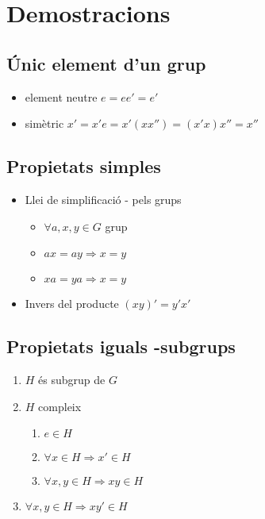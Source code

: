 \documentclass{article}
\begin{document}
\newpage\section{Demostracions}
\subsection{Únic element d'un grup}
\begin{itemize}
\item element neutre $e = ee' = e'$
\item simètric $x' = x'e = x'(xx'') = (x'x)x'' = x''$
\end{itemize}
\subsection{Propietats simples}
\begin{itemize}
\item Llei de simplificació - pels grups
	\begin{itemize}
	\item $\forall a, x, y \in G$ grup
	\item $ax = ay \Rightarrow x = y$
	\item $xa = ya \Rightarrow x = y$
	\end{itemize}
\item Invers del producte
	\subitem $(xy)' = y'x'$
\end{itemize}
\subsection{Propietats iguals -subgrups}
\begin{enumerate}
\item $H$ és subgrup de $G$
\item $H$ compleix
	\begin{enumerate}
	\item $e \in H$
	\item $\forall x \in H \Rightarrow x' \in H$
	\item $\forall x, y \in H \Rightarrow xy \in H$
	\end{enumerate}
\item $\forall x, y \in H \Rightarrow xy' \in H$
\end{enumerate}
\end{document}
